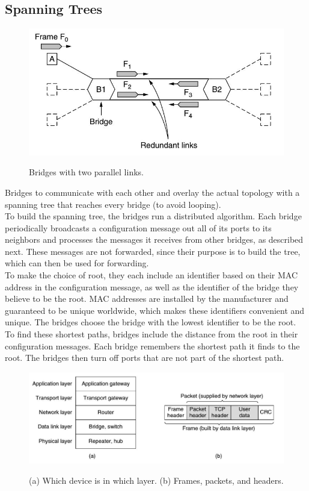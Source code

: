 \documentclass[a4paper,oneside]{book}
\begin{document}
\subsection{Spanning Trees}
\begin{figure}[H]
\caption{Bridges with two parallel links.}
\includegraphics[scale=0.6]{Images/spanningTreecn}
\label{fig:cn_spanning_tree}
\end{figure}
Bridges to communicate with each other and overlay the actual topology with a spanning tree that reaches every bridge (to avoid looping). \\
To build the spanning tree, the bridges run a distributed algorithm. Each bridge periodically broadcasts a configuration message out all of its ports to its neighbors and processes the messages it receives from other bridges, as described next. These messages are not forwarded, since their purpose is to build the tree, which can then be used for forwarding.\\
To make the choice of root, they each include an identifier based on their MAC address in the configuration message, as well as the identifier of the bridge they believe to be the root. MAC addresses are installed by the manufacturer and guaranteed to be unique worldwide, which makes these identifiers convenient and unique. The bridges choose the bridge with the lowest identifier to be the root.\\
To find these shortest paths, bridges include the distance from the root in their configuration messages. Each bridge remembers the shortest path it finds to the root. The bridges then turn off ports that are not part of the shortest path.
\begin{figure}[H]
\caption{ (a) Which device is in which layer. (b) Frames, packets, and headers.}
\includegraphics[scale=0.6]{Images/sample}
\label{fig:cn_layer}
\end{figure}
\end{document}
